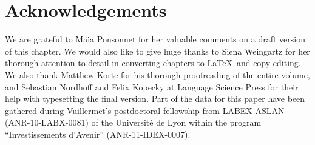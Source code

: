\documentclass[output=paper,colorlinks,citecolor=brown
]{langscibook}
\begin{document}
\section*{Acknowledgements}
We are grateful to Ma\"{\i}a Ponsonnet for her valuable comments on a draft version of this chapter. We would also like to give huge thanks to Siena Weingartz for her thorough attention to detail in converting chapters to \LaTeX\ and copy-editing. We also thank Matthew Korte for his thorough proofreading of the entire volume, and Sebastian Nordhoff and Felix Kopecky at Language Science Press for their help with typesetting the final version. Part of the data for this paper have been gathered during Vuillermet's postdoctoral fellowship from LABEX ASLAN (ANR-10-LABX-0081) of the Université de Lyon within the program ``Investissements d'Avenir'' (ANR-11-IDEX-0007).
\end{document}
